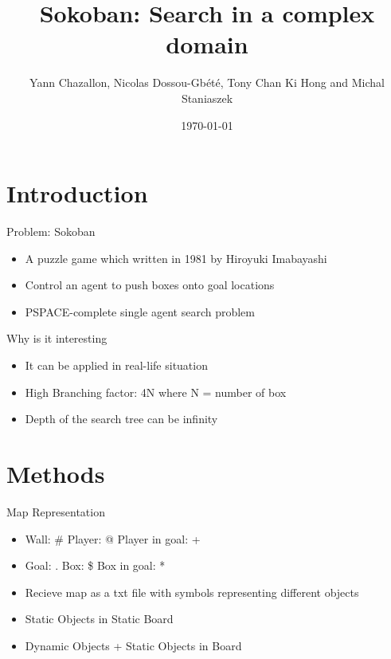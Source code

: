 \documentclass{beamer}
\title[Sokoban] %
{Sokoban: Search in a complex domain}
\author[Chazallon, Dossou-Gb{\'e}t{\'e}, Hong, Staniaszek]{Yann Chazallon,  Nicolas Dossou-Gb{\'e}t{\'e}, Tony Chan Ki Hong and Michal Staniaszek}
\date{\today}
\begin{document}
\begin{frame}
  \titlepage
\end{frame}

\section{Introduction}

\begin{frame}

   Problem: Sokoban
  
  \begin{itemize}
  \item A puzzle game which written in 1981 by Hiroyuki Imabayashi
  \item Control an agent to push boxes onto goal locations 
  \item PSPACE-complete single agent search problem
  \end{itemize}
\end{frame}

\begin{frame}

   Why is it interesting

  \begin{itemize}
  \item It can be applied in real-life situation
  \item High Branching factor: 4N where N = number of box
  \item Depth of the search tree can be infinity
  \end{itemize}

\end{frame}

\section{Methods}

\begin{frame}
  Map Representation
  \begin{itemize}
  \item Wall:  \: \#  \: \: \: \:    Player:  \:@   \: \:\: \: \:  \: \: \: \: \: \:     Player in goal:  \: +
  \item Goal:  \: .	   \: \: \: \:     Box:  \: \$	 \:  \: \: \:  \: \: \: \: \: \: \: \:     Box in goal:  \: *
  \item Recieve map as a txt file with symbols representing different objects
  \item Static Objects in Static Board
  \item Dynamic Objects + Static Objects in Board
  \end{itemize}

\end{frame}
\end{document}
